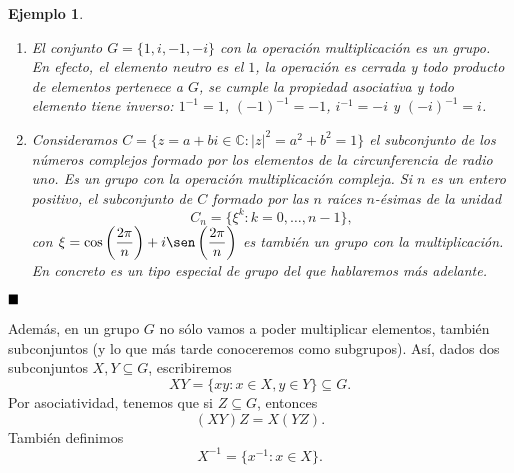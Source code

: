 \documentclass[12pt]{article}
\newtheorem{example}{Ejemplo}[theorem]
\providecommand{\abs}[1]{\lvert#1\rvert}
\begin{document}
\begin{example}
\begin{enumerate}
A propósito del anterior, del \textit{grupo general lineal}, sabemos que es un grupo abeliano con la operación multiplicación de matrices. Su elemento neutro es la \textit{matriz identidad}, y se tiene \begin{center}
$A:=  \left (\begin{array}{cccc}
a & b\\
c & d
\end{array} \right) \longrightarrow A^{-1} = \frac{1}{ad-bc}\left (\begin{array}{cccc}
d & -b\\
-c & a
\end{array} \right)$
\end{center}
\item El conjunto $ G = \lbrace 1,i,-1,-i\rbrace$ con la operación multiplicación es un grupo. En efecto, el elemento neutro es el $1$, la operación es cerrada y todo producto de elementos pertenece a $G$, se cumple la propiedad asociativa y todo elemento tiene inverso: $1^{-1} = 1$, $(-1)^{-1} = -1$, $i^{-1} = -i$ y $(-i)^{-1} = i$.
\item  Consideramos $C = \lbrace z = a+bi \in \mathbb{C} : \abs{z}^{2} = a^{2}+b^{2} = 1\rbrace$ el subconjunto de los números complejos formado por los elementos de la circunferencia de radio uno. Es un grupo con la operación multiplicación compleja. Si $n$ es un entero positivo, el subconjunto de $C$ formado por las $n$ raíces $n$-ésimas de la unidad $$C_{n} = \lbrace \xi^{k} : k = 0, \ldots, n-1 \rbrace,$$ con $\xi = \cos \left( \dfrac{2\pi}{n}\right) + i \sen \left( \dfrac{2\pi}{n}\right) $ es también un grupo con la multiplicación. En concreto es un tipo especial de grupo del que hablaremos más adelante.

\end{enumerate}
\end{example}

$\hfill \blacksquare$

Además, en un grupo $G$ no sólo vamos a poder multiplicar elementos, también subconjuntos (y lo que más tarde conoceremos como subgrupos). Así, dados dos subconjuntos $X,Y \subseteq G$, escribiremos $$XY = \lbrace xy : x \in X, y \in Y \rbrace \subseteq G.$$ 
Por asociatividad, tenemos que si $Z \subseteq G$, entonces $$(XY)Z= X(YZ).$$ También definimos $$X^{-1} = \lbrace x^{-1}: x \in X \rbrace .$$
\end{document}
